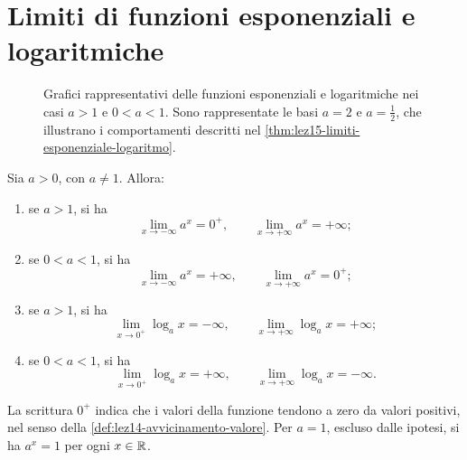 \section{Limiti di funzioni esponenziali e logaritmiche}
\label{sec:lez15-limiti-elementari}

\begin{figure}[htbp]
  \centering
  
  \caption{Grafici rappresentativi delle funzioni esponenziali e logaritmiche
  nei casi \(a>1\) e \(0<a<1\). Sono rappresentate le basi
  \(a=2\) e \(a=\frac12\), che illustrano i comportamenti descritti
  nel \cref{thm:lez15-limiti-esponenziale-logaritmo}.}
  \label{fig:lez15-esponenziale-logaritmo}
\end{figure}

\clearpage

\begin{theorem}
\label{thm:lez15-limiti-esponenziale-logaritmo}
Sia \(a>0\), con \(a\ne1\). Allora:
\begin{enumerate}
  \item se \(a>1\), si ha
  \[
    \lim_{x\to-\infty}a^x=0^+,
    \qquad
    \lim_{x\to+\infty}a^x=+\infty;
  \]
  \item se \(0<a<1\), si ha
  \[
    \lim_{x\to-\infty}a^x=+\infty,
    \qquad
    \lim_{x\to+\infty}a^x=0^+;
  \]
  \item se \(a>1\), si ha
  \[
    \lim_{x\to0^+}\log_a x=-\infty,
    \qquad
    \lim_{x\to+\infty}\log_a x=+\infty;
  \]
  \item se \(0<a<1\), si ha
  \[
    \lim_{x\to0^+}\log_a x=+\infty,
    \qquad
    \lim_{x\to+\infty}\log_a x=-\infty.
  \]
\end{enumerate}
La scrittura \(0^+\) indica che i valori della funzione
tendono a zero da valori positivi, nel senso della
\cref{def:lez14-avvicinamento-valore}.
Per \(a=1\), escluso dalle ipotesi, si ha
\(a^x=1\) per ogni \(x\in\mathbb{R}\).
\end{theorem}

